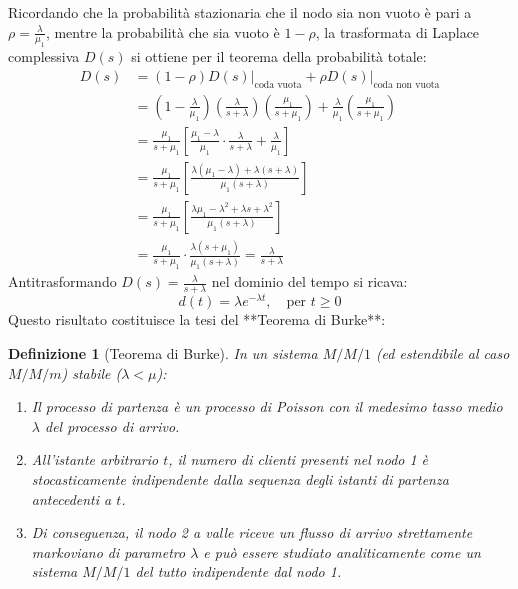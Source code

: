 \documentclass[11pt, a4paper]{article}
\newtheorem{theorem}{Definizione}
\begin{document}
Ricordando che la probabilità stazionaria che il nodo sia non vuoto è pari a $\rho = \frac{\lambda}{\mu_1}$, mentre la probabilità che sia vuoto è $1 - \rho$, la trasformata di Laplace complessiva $D(s)$ si ottiene per il teorema della probabilità totale:
\begin{align*}
    D(s) &= (1 - \rho) D(s) \big|_{\text{coda vuota}} + \rho D(s) \big|_{\text{coda non vuota}} \\
         &= \left( 1 - \frac{\lambda}{\mu_1} \right) \left( \frac{\lambda}{s + \lambda} \right) \left( \frac{\mu_1}{s + \mu_1} \right) + \frac{\lambda}{\mu_1} \left( \frac{\mu_1}{s + \mu_1} \right) \\
         &= \frac{\mu_1}{s + \mu_1} \left[ \frac{\mu_1 - \lambda}{\mu_1} \cdot \frac{\lambda}{s + \lambda} + \frac{\lambda}{\mu_1} \right] \\
         &= \frac{\mu_1}{s + \mu_1} \left[ \frac{\lambda(\mu_1 - \lambda) + \lambda(s + \lambda)}{\mu_1 (s + \lambda)} \right] \\
         &= \frac{\mu_1}{s + \mu_1} \left[ \frac{\lambda \mu_1 - \lambda^2 + \lambda s + \lambda^2}{\mu_1 (s + \lambda)} \right] \\
         &= \frac{\mu_1}{s + \mu_1} \cdot \frac{\lambda(s + \mu_1)}{\mu_1 (s + \lambda)} = \frac{\lambda}{s + \lambda}
\end{align*}
Antitrasformando $D(s) = \frac{\lambda}{s + \lambda}$ nel dominio del tempo si ricava:
\[
\boxed{d(t) = \lambda e^{-\lambda t}, \quad \text{per } t \ge 0}
\]
Questo risultato costituisce la tesi del **Teorema di Burke**:
\begin{theorem}[Teorema di Burke]
In un sistema $M/M/1$ (ed estendibile al caso $M/M/m$) stabile ($\lambda < \mu$):
\begin{enumerate}
    \item Il processo di partenza è un processo di Poisson con il medesimo tasso medio $\lambda$ del processo di arrivo.
    \item All'istante arbitrario $t$, il numero di clienti presenti nel nodo 1 è stocasticamente indipendente dalla sequenza degli istanti di partenza antecedenti a $t$.
    \item Di conseguenza, il nodo 2 a valle riceve un flusso di arrivo strettamente markoviano di parametro $\lambda$ e può essere studiato analiticamente come un sistema $M/M/1$ del tutto indipendente dal nodo 1.
\end{enumerate}
\end{theorem}

\end{document}
